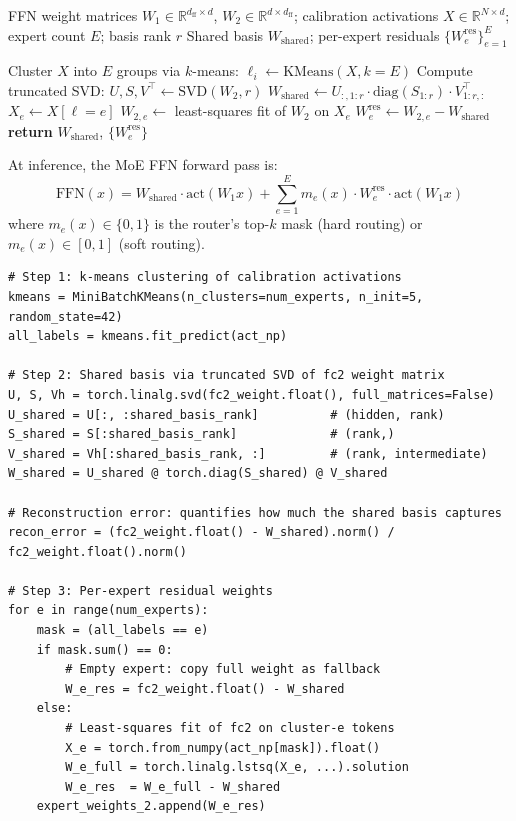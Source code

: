 \documentclass[12pt,a4paper]{article}
\begin{document}
\begin{algorithm}[H]
\caption{Shared-Basis + Residual Expert Extraction}
\label{alg:extract}
\begin{algorithmic}[1]
\Require FFN weight matrices $W_1 \in \mathbb{R}^{d_\text{ff} \times d}$, $W_2 \in \mathbb{R}^{d \times d_\text{ff}}$; calibration activations $X \in \mathbb{R}^{N \times d}$; expert count $E$; basis rank $r$
\Ensure Shared basis $W_\text{shared}$; per-expert residuals $\{W_e^\text{res}\}_{e=1}^{E}$

\State Cluster $X$ into $E$ groups via $k$-means: $\ell_i \gets \text{KMeans}(X, k=E)$
\State Compute truncated SVD: $U, S, V^\top \gets \text{SVD}(W_2, r)$
\State $W_\text{shared} \gets U_{:,1:r} \cdot \text{diag}(S_{1:r}) \cdot V_{1:r,:}^\top$
    \State $X_e \gets X[\ell = e]$ 
    \State $W_{2,e} \gets$ least-squares fit of $W_2$ on $X_e$
    \State $W_e^\text{res} \gets W_{2,e} - W_\text{shared}$ 
\EndFor
\State \textbf{return} $W_\text{shared}$, $\{W_e^\text{res}\}$
\end{algorithmic}
\end{algorithm}

At inference, the MoE FFN forward pass is:
\begin{equation}
\text{FFN}(x) = W_\text{shared} \cdot \text{act}(W_1 x) + \sum_{e=1}^{E} m_e(x) \cdot W_e^\text{res} \cdot \text{act}(W_1 x)
\label{eq:moe_fwd}
\end{equation}
where $m_e(x) \in \{0,1\}$ is the router's top-$k$ mask (hard routing) or $m_e(x) \in [0,1]$ (soft routing).

\begin{lstlisting}[caption={Core SVD decomposition and residual computation (excerpt from \texttt{clear\_moe/extraction.py}).},label={lst:extract}]
# Step 1: k-means clustering of calibration activations
kmeans = MiniBatchKMeans(n_clusters=num_experts, n_init=5, random_state=42)
all_labels = kmeans.fit_predict(act_np)

# Step 2: Shared basis via truncated SVD of fc2 weight matrix
U, S, Vh = torch.linalg.svd(fc2_weight.float(), full_matrices=False)
U_shared = U[:, :shared_basis_rank]          # (hidden, rank)
S_shared = S[:shared_basis_rank]             # (rank,)
V_shared = Vh[:shared_basis_rank, :]         # (rank, intermediate)
W_shared = U_shared @ torch.diag(S_shared) @ V_shared

# Reconstruction error: quantifies how much the shared basis captures
recon_error = (fc2_weight.float() - W_shared).norm() / fc2_weight.float().norm()

# Step 3: Per-expert residual weights
for e in range(num_experts):
    mask = (all_labels == e)
    if mask.sum() == 0:
        # Empty expert: copy full weight as fallback
        W_e_res = fc2_weight.float() - W_shared
    else:
        # Least-squares fit of fc2 on cluster-e tokens
        X_e = torch.from_numpy(act_np[mask]).float()
        W_e_full = torch.linalg.lstsq(X_e, ...).solution
        W_e_res  = W_e_full - W_shared
    expert_weights_2.append(W_e_res)
\end{lstlisting}
\end{document}

